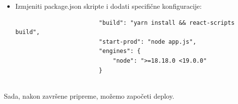 \begin{packed_enum}
\begin{itemize}
\begin{lstlisting}
						// Proxy
						app.use(
						"/api",
						createProxyMiddleware({
							target: API_BASE_URL,
							changeOrigin: true,
						})
						);
						
						app.use(express.static(path.join(__dirname, 'build')));
						
						app.listen(PORT, HOST, () => {
							console.log(`Starting Proxy at ${HOST}:${PORT}`);
						});
						
						app.get("*", async (req, res) => {
							res.sendFile(path.join(__dirname, 'build', 'index.html'))
						});
						
					\end{lstlisting}
					\item Izmjeniti package.json skripte i dodati specifične konfiguracije:
					\begin{lstlisting}
						"build": "yarn install && react-scripts build",
						"start-prod": "node app.js",
						"engines": {
							"node": ">=18.18.0 <19.0.0"
						}
						
					\end{lstlisting}
				\end{itemize}
			\end{packed_enum}
			
			Sada, nakon završene pripreme, možemo započeti deploy.
			
